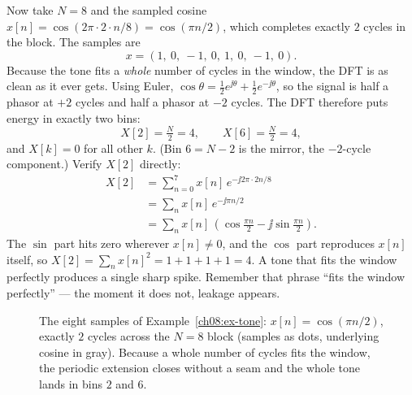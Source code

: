 \begin{example}
\label{ch08:ex-tone}
Now take $N=8$ and the sampled cosine $x[n] = \cos(2\pi \cdot 2 \cdot n / 8) =
\cos(\pi n/2)$, which completes exactly $2$ cycles in the block. The samples are
\[
x = (1,\ 0,\ -1,\ 0,\ 1,\ 0,\ -1,\ 0).
\]
Because the tone fits a \emph{whole} number of cycles in the window, the DFT is as
clean as it ever gets. Using Euler, $\cos\theta = \tfrac12 e^{\jj\theta} +
\tfrac12 e^{-\jj\theta}$, so the signal is half a phasor at $+2$ cycles and half a
phasor at $-2$ cycles. The DFT therefore puts energy in exactly two bins:
\[
X[2] = \tfrac{N}{2} = 4, \qquad X[6] = \tfrac{N}{2} = 4,
\]
and $X[k] = 0$ for all other $k$. (Bin $6 = N-2$ is the mirror, the $-2$-cycle
component.) Verify $X[2]$ directly:
\begin{align*}
X[2] &= \sum_{n=0}^{7} x[n]\, e^{-\jj 2\pi \cdot 2 n / 8} \\
&= \sum_n x[n]\, e^{-\jj \pi n / 2} \\
&= \sum_n x[n]\,(\cos\tfrac{\pi n}{2} - \jj\sin\tfrac{\pi n}{2}).
\end{align*}
The $\sin$ part hits zero wherever $x[n]\neq 0$, and the $\cos$ part reproduces
$x[n]$ itself, so $X[2] = \sum_n x[n]^2 = 1+1+1+1 = 4$. A tone that fits the
window perfectly produces a single sharp spike. Remember that phrase ``fits the
window perfectly'' --- the moment it does not, leakage appears.
\end{example}

\begin{figure}[H]
\centering
{}
\caption{The eight samples of Example~\ref{ch08:ex-tone}: $x[n]=\cos(\pi n/2)$,
exactly $2$ cycles across the $N=8$ block (samples as dots, underlying cosine in
gray). Because a whole number of cycles fits the window, the periodic extension
closes without a seam and the whole tone lands in bins $2$ and $6$.}
\label{ch08:fig-tone-time}
\end{figure}

